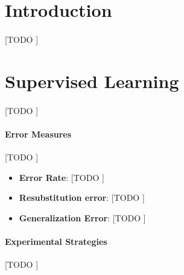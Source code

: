 \documentclass{article}
\begin{document}
	\maketitle
	\thispagestyle{firststyle}



	\begin{abstract}
		\noindent [TODO ]
	\end{abstract}



	\section{Introduction}
	\label{sec:intro}

			\paragraph{}
			[TODO ]


	\section{Supervised Learning}
	\label{sec:supervised-learning}

		\paragraph{}
		[TODO ]

		\paragraph{Error Measures}
		\label{paragraph:error-measures}
		[TODO ]

		\begin{itemize}
			\item
				\textbf{Error Rate}:
				[TODO ]

			\item
				\textbf{Resubstitution error}:
				[TODO ]

			\item
				\textbf{Generalization Error}:
				[TODO ]

		\end{itemize}

		\paragraph{Experimental Strategies}
		\label{paragraph:experimental-strategies}
  	[TODO ]
\end{document}
